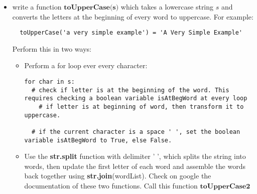 \documentclass[11pt,a4paper]{report}
\begin{document}
\begin{itemize}
  \item write a function $\textbf{toUpperCase(s)}$ which takes a lowercase string $s$ and converts the letters at the beginning of every word to uppercase. For example: 
  \begin{lstlisting}
  toUpperCase('a very simple example') = 'A Very Simple Example'
  \end{lstlisting}   
  Perform this in two ways:
  \begin{itemize}
   \item Perform a for loop ever every character:
     \begin{lstlisting}
for char in s:
  # check if letter is at the beginning of the word. This requires checking a boolean variable isAtBegWord at every loop
    # if letter is at beginning of word, then transform it to uppercase. 
    
  # if the current character is a space ' ', set the boolean variable isAtBegWord to True, else False.
  \end{lstlisting}  
  \item Use the \textbf{str.split} function with delimiter ' ', which splits the string into words, then update the first letter of each word and assemble the words back together using \textbf{str.join}(wordList). Check on google the documentation of these two functions. Call this function $\textbf{toUpperCase2}$
  
  \end{itemize}


\end{itemize}
\end{document}
